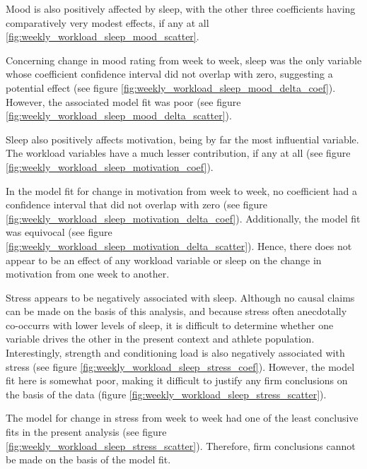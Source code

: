 \documentclass{article}
\begin{document}

			Mood is also positively affected by sleep, with the other three coefficients
			having comparatively very modest effects, if any at all
			\ref{fig:weekly_workload_sleep_mood_scatter}.


			Concerning change in mood rating from week to week, sleep was the
			only variable whose coefficient confidence interval did
			not overlap with zero, suggesting a potential effect
			(see figure \ref{fig:weekly_workload_sleep_mood_delta_coef}).
			However, the associated model fit was poor (see figure
			\ref{fig:weekly_workload_sleep_mood_delta_scatter}).


			Sleep also positively affects motivation, being by far the most influential
			variable. The workload variables have a much lesser contribution, if any
			at all (see figure \ref{fig:weekly_workload_sleep_motivation_coef}).


			In the model fit for change in motivation from week to week, no
			coefficient had a confidence interval that did not overlap with zero
			(see figure
			\ref{fig:weekly_workload_sleep_motivation_delta_coef}). Additionally, the
			model fit was equivocal (see figure
			\ref{fig:weekly_workload_sleep_motivation_delta_scatter}).
			Hence, there does not appear to be an effect of any workload variable
			or sleep on the change in motivation from one week to another.


			Stress appears to be negatively associated with sleep.
			Although no causal claims can
			be made on the basis of this analysis, and because stress often
			anecdotally co-occurrs with lower levels of sleep, it is difficult
			to determine whether one variable drives the other in the
			present context and athlete population. Interestingly,
			strength and conditioning load is also negatively associated with stress
			(see figure
			\ref{fig:weekly_workload_sleep_stress_coef}). However, the model fit here
			is somewhat poor, making it difficult to justify any firm conclusions on the
			basis of the data (figure \ref{fig:weekly_workload_sleep_stress_scatter}).


			The model for change in stress from week to week had one of the least
			conclusive fits in the present analysis (see figure
			\ref{fig:weekly_workload_sleep_stress_scatter}). Therefore, firm
			conclusions cannot be made on the basis of the model fit.
\end{document}
